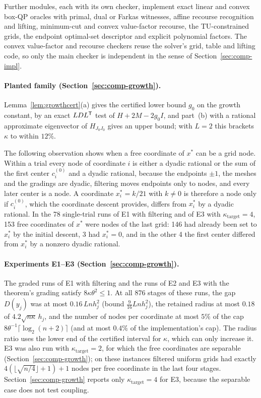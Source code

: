 Further modules, each with its own checker, implement exact linear and convex
box-QP oracles with primal, dual or Farkas witnesses, affine recourse
recognition and lifting, minimum-cut and convex value-factor recourse, the
TU-constrained grids, the endpoint optimal-set descriptor and explicit
polynomial factors. The convex value-factor and recourse checkers reuse the
solver's grid, table and lifting code, so only the main checker is
independent in the sense of Section~\ref{sec:comp-impl}.

\paragraph{Planted family (Section~\ref{sec:comp-growth}).}
Lemma~\ref{lem:growthcert}(a) gives the certified lower bound $g_0$ on the
growth constant, by an exact $LDL^\mathsf T$ test of $H+2M-2g_0I$, and part~(b) with
a rational approximate eigenvector of $H_{J_0J_0}$ gives an upper bound; with
$L=2$ this brackets $\kappa$ to within $12\%$.

The following observation shows when a free coordinate of $x^*$ can be a
grid node. Within a trial every node of coordinate $i$ is either a dyadic rational or the
sum of the first center $c_i^{(0)}$ and a dyadic rational, because the
endpoints $\pm1$, the meshes and the gradings are dyadic, filtering moves
endpoints only to nodes, and every later center is a node. A coordinate
$x^*_i=k/21$ with $k\ne0$ is therefore a node only if $c_i^{(0)}$, which the
coordinate descent provides, differs from $x^*_i$ by a dyadic rational. In the
78 single-trial runs of E1 with filtering and of E3 with
$\kappa_{\mathrm{target}}=4$, 153 free coordinates of $x^*$ were nodes of the
last grid: 146 had already been set to $x^*_i$ by the initial descent, 3 had
$x^*_i=0$, and in the other 4 the first center differed from $x^*_i$ by a
nonzero dyadic rational.

\paragraph{Experiments E1--E3 (Section~\ref{sec:comp-growth}).}
The graded runs of E1 with filtering and the runs of E2 and E3 with the
theorem's grading satisfy $8\kappa\theta^2\le1$. At all 876 stages of these
runs, the gap $D(y_j)$ was at most $0.16\,Lnh_j^2$ (bound
$\frac9{16}Lnh_j^2$), the retained radius at most $0.18$ of
$4.2\sqrt{n\kappa}\,h_j$, and the number of nodes per coordinate at most
$5\%$ of the cap $8\theta^{-1}\lceil\log_2(n+2)\rceil$ (and at most $0.4\%$ of
the implementation's cap). The radius ratio uses the lower end of the
certified interval for $\kappa$, which can only increase it.
E3 was also run with $\kappa_{\mathrm{target}}=2$, for which the free
coordinates are separable (Section~\ref{sec:comp-growth}); on these instances
filtered uniform grids had exactly $4(\lfloor\sqrt{n/4}\rfloor+1)+1$ nodes
per free coordinate in the last four stages. Section~\ref{sec:comp-growth}
reports only $\kappa_{\mathrm{target}}=4$ for E3, because the separable case
does not test coupling.

